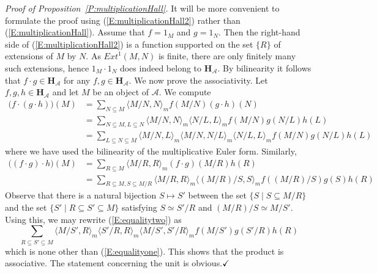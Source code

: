 \documentclass[a4paper,10pt]{amsart}
\def\H{\mathbf{H}}
\def\qed{$\hfill \checkmark$}
\numberwithin{equation}{section}
\begin{document}
\vspace{.2in}

\noindent
\textit{Proof of Proposition~\ref{P:multiplicationHall}.} It will be more convenient to formulate the proof using (\ref{E:multiplicationHall2}) rather than (\ref{E:multiplicationHall}). Assume that $f=1_M$ and $g=1_N$. Then the right-hand side of (\ref{E:multiplicationHall2}) is a function supported on the set $\{R\}$ of extensions of $M$ by $N$. As ${Ext}^1(M,N)$ is finite, there are only finitely many such extensions, hence $1_M\cdot 1_N$ does indeed belong to $\H_{\mathcal{A}}$. By bilinearity it follows that $f \cdot g \in \H_{\mathcal{A}}$ for any $f,g \in \H_{\mathcal{A}}$. We now prove the associativity.
Let $f,g,h \in \H_{\mathcal{A}}$ and let $M$ be an object of $\mathcal{A}$. We compute
\begin{equation}\label{E:equalityone}
\begin{split}
\big(f \cdot (g \cdot h)\big)(M)&= \sum_{N \subseteq M} \langle M/N,N\rangle_m f(M/N) (g\cdot h)(N)\\
&=\sum_{N \subseteq M, L \subseteq N} \langle M/N,N\rangle_m\langle N/L,L\rangle_m f(M/N) g(N/L) h(L)\\
&=\sum_{L \subseteq N \subseteq M} \langle M/N,L\rangle_m\langle M/N,N/L\rangle_m\langle N/L,L\rangle_m f(M/N) g(N/L) h(L)
\end{split}
\end{equation}
where we have used the bilinearity of the multiplicative Euler form. Similarly,
\begin{equation}\label{E:equalitytwo}
\begin{split}
\big((f \cdot g) \cdot h\big)(M)&= \sum_{R \subseteq M} \langle M/R,R\rangle_m (f\cdot g)(M/R) h(R)\\
&=\sum_{R \subseteq M, S \subseteq M/R} \langle M/R,R\rangle_m\langle (M/R)/S,S\rangle_m f((M/R)/S) g(S) h(R)
\end{split}
\end{equation}
Observe that there is a natural bijection $S \mapsto S'$ between the set $\{S\;|\;S \subseteq M/R\}$ and the set $\{S'\;|\; R \subseteq S' \subseteq M\}$ satisfying $S \simeq S'/R$ and $(M/R)/S \simeq M/S'$. Using this, we may rewrite (\ref{E:equalitytwo}) as
$$\sum_{R \subseteq S' \subseteq M} \langle M/S',R\rangle_m\langle S'/R,R\rangle_m \langle M/S',S'/R\rangle_m f(M/S') g(S'/R) h(R)$$
which is none other than (\ref{E:equalityone}). This shows that the product is associative. The statement concerning the unit is obvious.\qed
\end{document}
